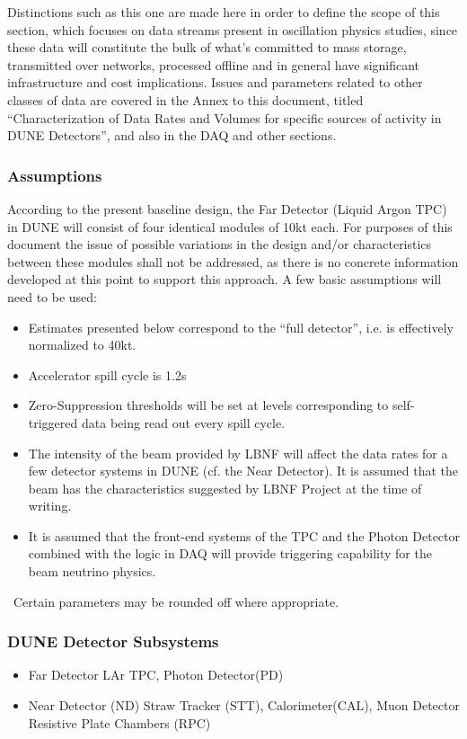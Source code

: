 Distinctions such as this one are made here in order to define the scope of this section, which focuses on data streams present in
oscillation physics studies, since these data will constitute the bulk of what's committed to mass storage, transmitted over networks,
processed offline and in general have significant infrastructure and cost implications. Issues and parameters related to other classes of data are covered in
the Annex to this document, titled ``Characterization of Data Rates and Volumes for specific sources of activity in DUNE Detectors'',
and also in the DAQ and other sections.

\subsubsection{Assumptions}
\label{sec:detectors-sc-infrastructure-assumptions}
According to the present baseline design, the Far Detector (Liquid Argon TPC) in DUNE will consist of four identical modules of 10kt each.
For purposes of this document the issue of possible variations in the design and/or characteristics between
these modules shall not be addressed, as there is no concrete information developed at this point to support this approach. A few basic assumptions
will need to be used:
\begin{itemize}
\item Estimates presented below correspond to the ``full detector'', i.e. is effectively normalized to 40kt.
\item Accelerator spill cycle is 1.2s
\item Zero-Suppression thresholds will be set at levels corresponding to self-triggered data being read out every spill cycle.
\item The intensity of the beam provided by LBNF will affect the data rates for a few detector systems in DUNE (cf. the Near Detector).
It is assumed that the beam has the characteristics suggested by LBNF Project at the time of writing.
\item It is assumed that the front-end systems of the TPC and the Photon Detector combined with the logic in DAQ
will provide triggering capability for the beam neutrino physics.
\end{itemize}
\
Certain parameters may be rounded off where appropriate.

\subsubsection{DUNE Detector Subsystems}
\begin{itemize}
\item Far Detector LAr TPC, Photon Detector(PD)
\item Near Detector (ND) Straw Tracker (STT), Calorimeter(CAL), Muon Detector Resistive Plate Chambers (RPC)
\end{itemize}

